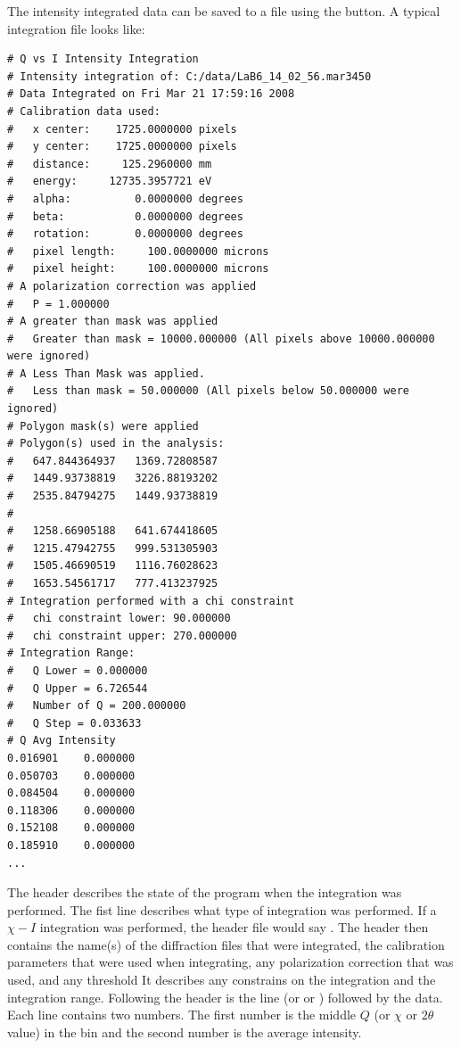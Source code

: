 The intensity integrated data can be saved to a file
using the  button. 
A typical integration file looks like:
\begin{lstlisting}
# Q vs I Intensity Integration
# Intensity integration of: C:/data/LaB6_14_02_56.mar3450 
# Data Integrated on Fri Mar 21 17:59:16 2008
# Calibration data used:
#   x center:    1725.0000000 pixels
#   y center:    1725.0000000 pixels
#   distance:     125.2960000 mm
#   energy:     12735.3957721 eV
#   alpha:          0.0000000 degrees
#   beta:           0.0000000 degrees
#   rotation:       0.0000000 degrees
#   pixel length:     100.0000000 microns
#   pixel height:     100.0000000 microns
# A polarization correction was applied
#   P = 1.000000
# A greater than mask was applied
#   Greater than mask = 10000.000000 (All pixels above 10000.000000 were ignored)
# A Less Than Mask was applied.
#   Less than mask = 50.000000 (All pixels below 50.000000 were ignored)
# Polygon mask(s) were applied
# Polygon(s) used in the analysis:
#   647.844364937	1369.72808587
#   1449.93738819	3226.88193202
#   2535.84794275	1449.93738819
#
#   1258.66905188	641.674418605
#   1215.47942755	999.531305903
#   1505.46690519	1116.76028623
#   1653.54561717	777.413237925
# Integration performed with a chi constraint
#   chi constraint lower: 90.000000
#   chi constraint upper: 270.000000
# Integration Range:
#   Q Lower = 0.000000
#   Q Upper = 6.726544
#   Number of Q = 200.000000
#   Q Step = 0.033633
# Q	Avg Intensity
0.016901	0.000000
0.050703	0.000000
0.084504	0.000000
0.118306	0.000000
0.152108	0.000000
0.185910	0.000000
...
\end{lstlisting}
The header describes the state of the program 
when the integration was performed.
The fist line describes what type of integration was
performed. If a $\chi-I$ integration was 
performed, the header file would say
.
The header then contains the name(s) of the diffraction
files that were integrated, the
calibration parameters that were used when integrating,
any polarization correction that was used, and any threshold 
It describes any constrains 
on the integration and the integration range. Following the header 
is the line
 (or 
or ) followed by 
the data. Each line contains two numbers.
The first number is the middle $Q$ (or $\chi$ or $2\theta$ value) 
in the bin and the second number is the average intensity.
